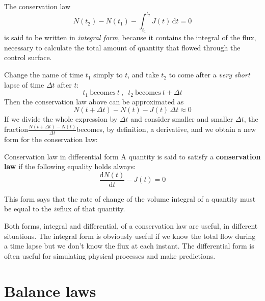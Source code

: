 \documentclass[a4paper,12pt,%
onecolumn,oneside,titlepage,%
british%
]{memoir}
\newcommand*{\di}{\mathrm{d}}%
\newcommand*{\incr}{\Delta}%
\renewcommand*{\|}[1][]{\nonscript\:#1\vert\nonscript\:\mathopen{}}
\newcommand*{\yN}{N}
\newcommand*{\yJ}{J}
\newcommand*{\Dt}{\incr t}
\begin{document}
The conservation law
\begin{equation*}
  \yN(t_{2}) - \yN(t_{1}) - \int_{t_{1}}^{t_{2}}\!\!\yJ(t)\, \di t = 0
\end{equation*}
is said to be written in \emph{integral form}, because it contains the integral of the flux, necessary to calculate the total amount of quantity that flowed through the control surface.

Change the name of time $t_{1}$ simply to $t$, and take $t_{2}$ to come after a \emph{very short} lapse of time $\Dt$ after $t$:
\begin{equation*}
  t_{1}\ \text{becomes}\ t\ ,\enspace t_{2}\ \text{becomes}\ t+\Dt
\end{equation*}
%
Then the conservation law above can be approximated as
\begin{equation*}
  \yN(t+\Dt) - \yN(t) - \yJ(t)\, \Dt \approx 0
\end{equation*}
If we divide the whole expression by $\Dt$ and consider smaller and smaller $\Dt$, the fraction\enspace$\frac{\yN(t+\Dt)-\yN(t)}{\Dt}$\enspace becomes, by definition, a derivative, and we obtain a new form for the conservation law:
\begin{definition}{Conservation law in differential form}
  A quantity is said to satisfy a \textbf{conservation law} if the following equality holds always:
  \begin{equation}
    \label{eq:conserved}
    \frac{\di\yN(t)}{\di t}- \yJ(t) = 0
  \end{equation}
\end{definition}
This form says that the rate of change of the volume integral of a quantity must be equal to the \emph{in}flux of that quantity.

Both forms, integral and differential, of a conservation law are useful, in different situations. The integral form is obviously useful if we know the total flow during a time lapse but we don't know the flux at each instant. The differential form is often useful for simulating physical processes and make predictions.


\section{Balance laws}
\label{sec:balance_laws}
\end{document}
